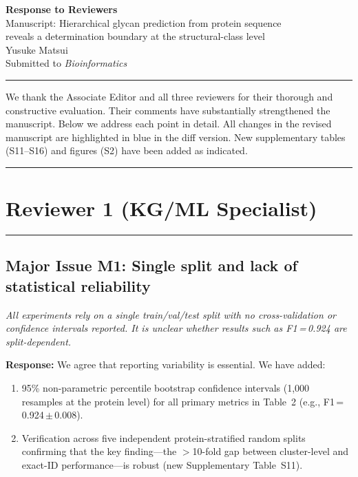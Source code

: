 \documentclass[11pt,a4paper]{article}
\newcommand{\reviewercomment}[1]{\textit{\color{black!70}#1}}
\newcommand{\response}[1]{\textbf{Response:} #1}
\begin{document}
\begin{center}
{\LARGE\bfseries Response to Reviewers}\\[0.8em]
{\large Manuscript: Hierarchical glycan prediction from protein sequence\\
reveals a determination boundary at the structural-class level}\\[0.5em]
{\normalsize Yusuke Matsui}\\[0.3em]
{\normalsize Submitted to \textit{Bioinformatics}}
\end{center}

\noindent\rule{\linewidth}{0.4pt}
\vspace{0.5em}

We thank the Associate Editor and all three reviewers for their thorough and
constructive evaluation. Their comments have substantially strengthened the
manuscript. Below we address each point in detail. All changes in the revised
manuscript are highlighted in blue in the diff version. New supplementary tables
(S11--S16) and figures (S2) have been added as indicated.

\vspace{1em}
\noindent\rule{\linewidth}{0.8pt}

\section*{Reviewer 1 (KG/ML Specialist)}
\noindent\rule{\linewidth}{0.4pt}

\subsection*{Major Issue M1: Single split and lack of statistical reliability}

\reviewercomment{All experiments rely on a single train/val/test split with no
cross-validation or confidence intervals reported. It is unclear whether
results such as F1\,=\,0.924 are split-dependent.}

\response{We agree that reporting variability is essential. We have added:
\begin{enumerate}[nosep]
  \item 95\% non-parametric percentile bootstrap confidence intervals (1,000
        resamples at the protein level) for all primary metrics in
        Table~2 (e.g., F1\,=\,0.924\,$\pm$\,0.008).
  \item Verification across five independent protein-stratified random splits
        confirming that the key finding---the $>$10-fold gap between cluster-level
        and exact-ID performance---is robust (new Supplementary Table~S11).
\end{enumerate}}
\end{document}
